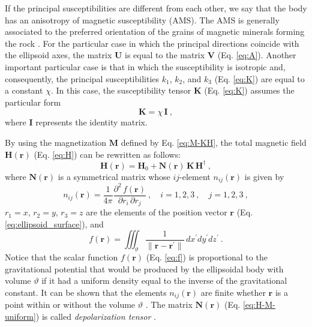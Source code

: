 \documentclass[gmd, manuscript]{copernicus}
\begin{document}
If the principal susceptibilities are different from
each other, we say that the body has an
anisotropy of magnetic susceptibility (AMS).
The AMS is generally associated to the preferred orientation
of the grains of magnetic minerals forming the rock
\citep{fuller1963, uyeda1963, janak1972, hrouda1982,
thompson1986, macdonald1987, rochette1992, dunlop1997,
tauxe2003}.
For the particular case in which the principal directions
coincide with the ellipsoid axes, the matrix $\mathbf{U}$ is
equal to the matrix $\mathbf{V}$ (Eq. \ref{eq:A}).
Another important particular case is that in which the
susceptibility is isotropic and, consequently, the principal
susceptibilities $k_{1}$, $k_{2}$, and $k_{3}$ (Eq. \ref{eq:K})
are equal to a constant $\chi$. In this case, the susceptibility
tensor $\mathbf{K}$ (Eq. \ref{eq:K}) assumes the particular form
\begin{equation}
\mathbf{K} = \chi \, \mathbf{I} \: ,
\label{eq:K-isotropic}
\end{equation}
where $\mathbf{I}$ represents the identity matrix.

By using the magnetization $\mathbf{M}$ defined by Eq. \ref{eq:M-KH},
the total magnetic field $\mathbf{H}(\mathbf{r})$ (Eq. \ref{eq:H})
can be rewritten as follows:
\begin{equation}
\mathbf{H}(\mathbf{r}) = \mathbf{H}_{0}
+ \mathbf{N}(\mathbf{r}) \, \mathbf{K} \, \mathbf{H}^{\dagger} \: ,
\label{eq:H-M-uniform}
\end{equation}
where $\mathbf{N}(\mathbf{r})$ is a symmetrical matrix whose
$ij$-element $n_{ij}(\mathbf{r})$ is given by
\begin{equation}
n_{ij}(\mathbf{r}) =
\frac{1}{4\pi} \frac{\partial^{2} \, f(\mathbf{r})}{\partial r_{i} \, \partial r_{j}}
\: , \quad i = 1, 2, 3 \: ,
\quad j = 1, 2, 3 \: ,
\label{eq:nij}
\end{equation}
$r_{1} = x$, $r_{2} = y$, $r_{3} = z$ are the elements of
the position vector $\mathbf{r}$ (Eq. \ref{eq:ellipsoid_surface}),
and
\begin{equation}
f(\mathbf{r}) = \iiint_{\vartheta}
\frac{1}{\| \mathbf{r} - \mathbf{r}^{\prime} \|}
\, dx^{\prime}dy^{\prime}dz^{\prime} \: .
\label{eq:f}
\end{equation}
Notice that the scalar function $f(\mathbf{r})$
(Eq. \ref{eq:f}) is proportional
to the gravitational potential that would be produced by the
ellipsoidal body with volume $\vartheta$ if it had a uniform density
equal to the inverse of the gravitational constant.
It can be shown that the elements $n_{ij}(\mathbf{r})$ are
finite whether $\mathbf{r}$ is a point within or without
the volume $\vartheta$ \citep{peirce1902, webster1904}.
The matrix $\mathbf{N}(\mathbf{r})$ (Eq. \ref{eq:H-M-uniform})
is called \textit{depolarization tensor} \citep{soliverez1981, soliverez2008}.
\end{document}
